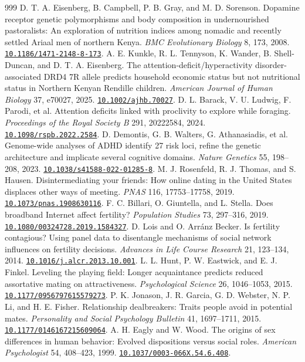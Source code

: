 \documentclass[10pt,twocolumn,letterpaper]{article}
\newcommand{\doi}[1]{\href{https://doi.org/#1}{\nolinkurl{#1}}}
\begin{document}
\begin{thebibliography}{999}
 D. T. A. Eisenberg, B. Campbell, P. B. Gray, and M. D. Sorenson. Dopamine receptor genetic polymorphisms and body composition in undernourished pastoralists: An exploration of nutrition indices among nomadic and recently settled Ariaal men of northern Kenya. \emph{BMC Evolutionary Biology} 8, 173, 2008. \doi{10.1186/1471-2148-8-173}.
 A. E. Kunkle, R. L. Tennyson, K. Wander, B. Shell-Duncan, and D. T. A. Eisenberg. The attention-deficit/hyperactivity disorder-associated DRD4 7R allele predicts household economic status but not nutritional status in Northern Kenyan Rendille children. \emph{American Journal of Human Biology} 37, e70027, 2025. \doi{10.1002/ajhb.70027}.
 D. L. Barack, V. U. Ludwig, F. Parodi, et al. Attention deficits linked with proclivity to explore while foraging. \emph{Proceedings of the Royal Society B} 291, 20222584, 2024. \doi{10.1098/rspb.2022.2584}.
 D. Demontis, G. B. Walters, G. Athanasiadis, et al. Genome-wide analyses of ADHD identify 27 risk loci, refine the genetic architecture and implicate several cognitive domains. \emph{Nature Genetics} 55, 198--208, 2023. \doi{10.1038/s41588-022-01285-8}.
 M. J. Rosenfeld, R. J. Thomas, and S. Hausen. Disintermediating your friends: How online dating in the United States displaces other ways of meeting. \emph{PNAS} 116, 17753--17758, 2019. \doi{10.1073/pnas.1908630116}.
 F. C. Billari, O. Giuntella, and L. Stella. Does broadband Internet affect fertility? \emph{Population Studies} 73, 297--316, 2019. \doi{10.1080/00324728.2019.1584327}.
 D. Lois and O. Arr\'anz Becker. Is fertility contagious? Using panel data to disentangle mechanisms of social network influences on fertility decisions. \emph{Advances in Life Course Research} 21, 123--134, 2014. \doi{10.1016/j.alcr.2013.10.001}.
 L. L. Hunt, P. W. Eastwick, and E. J. Finkel. Leveling the playing field: Longer acquaintance predicts reduced assortative mating on attractiveness. \emph{Psychological Science} 26, 1046--1053, 2015. \doi{10.1177/0956797615579273}.
 P. K. Jonason, J. R. Garcia, G. D. Webster, N. P. Li, and H. E. Fisher. Relationship dealbreakers: Traits people avoid in potential mates. \emph{Personality and Social Psychology Bulletin} 41, 1697--1711, 2015. \doi{10.1177/0146167215609064}.
 A. H. Eagly and W. Wood. The origins of sex differences in human behavior: Evolved dispositions versus social roles. \emph{American Psychologist} 54, 408--423, 1999. \doi{10.1037/0003-066X.54.6.408}.
\end{thebibliography}
\endgroup
\end{document}
